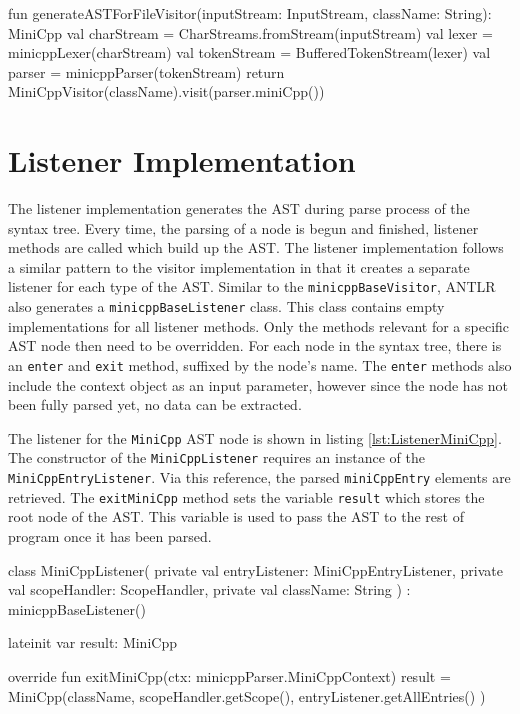 \begin{KotlinCode}[float,numbers=none,caption=Code for the generation of the AST using the visitor-pattern., label=lst:VisitorExec]
fun generateASTForFileVisitor(inputStream: InputStream, className: String): MiniCpp{
    val charStream = CharStreams.fromStream(inputStream)
    val lexer = minicppLexer(charStream)
    val tokenStream = BufferedTokenStream(lexer)
    val parser = minicppParser(tokenStream)
    return MiniCppVisitor(className).visit(parser.miniCpp())
}
\end{KotlinCode}

\section{Listener Implementation}

The listener implementation generates the AST during parse process of the syntax tree. Every time, the parsing of a node is begun and finished, listener methods are called which build up the AST. The listener implementation follows a similar pattern to the visitor implementation in that it creates a separate listener for each type of the AST. Similar to the \verb|minicppBaseVisitor|, ANTLR also generates a \verb|minicppBaseListener| class. This class contains empty implementations for all listener methods. Only the methods relevant for a specific AST node then need to be overridden. For each node in the syntax tree, there is an \verb|enter| and \verb|exit| method, suffixed by the node's name. The \verb|enter| methods also include the context object as an input parameter, however since the node has not been fully parsed yet, no data can be extracted. 

The listener for the \verb|MiniCpp| AST node is shown in listing \ref{lst:ListenerMiniCpp}. The constructor of the \verb|MiniCppListener| requires an instance of the \verb|MiniCppEntryListener|. Via this reference, the parsed \verb|miniCppEntry| elements are retrieved. The \verb|exitMiniCpp| method sets the variable \verb|result| which stores the root node of the AST. This variable is used to pass the AST to the rest of program once it has been parsed.

\begin{KotlinCode}[float,numbers=none,caption=Implementation of the \texttt{MiniCppListener} class., label=lst:ListenerMiniCpp]
class MiniCppListener(
    private val entryListener: MiniCppEntryListener,
    private val scopeHandler: ScopeHandler,
    private val className: String
) : minicppBaseListener() {

    lateinit var result: MiniCpp

    override fun exitMiniCpp(ctx: minicppParser.MiniCppContext) {
        result = MiniCpp(className, 
                         scopeHandler.getScope(), 
                         entryListener.getAllEntries()
                         )
    }
}
\end{KotlinCode}

